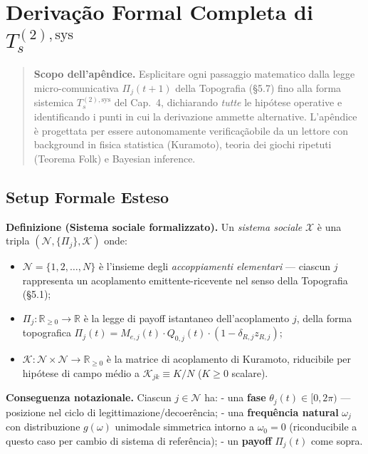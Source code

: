 \chapter{\texorpdfstring{Derivação Formal Completa di
\(T_s^{(2),\text{sys}}\)}{Derivação Formal Completa di T\_s\^{}\{(2),\textbackslash text\{sys\}\}}}\label{derivazione-formale-completa-di-t_s2textsys}

\begin{quote}
\textbf{Scopo dell'apêndice.} Esplicitare ogni passaggio matematico
dalla legge micro-comunicativa \(\Pi_j(t+1)\) della Topografia (\S{}5.7)
fino alla forma sistemica \(T_s^{(2),\text{sys}}\) del Cap.~4,
dichiarando \emph{tutte} le hipótese operative e identificando i punti in
cui la derivazione ammette alternative. L'apêndice è progettata per
essere autonomamente verificaçãobile da un lettore con background in fisica
statistica (Kuramoto), teoria dei giochi ripetuti (Teorema Folk) e
Bayesian inference.
\end{quote}



\section{Setup Formale Esteso}\label{setup-formale-esteso}

\Hypoth{} \textbf{Definizione (Sistema sociale formalizzato).} Un
\emph{sistema sociale} \(\mathcal{X}\) è una tripla
\((\mathcal{N}, \{\Pi_j\}, \mathcal{K})\) onde:

\begin{itemize}
\tightlist
\item
  \(\mathcal{N} = \{1, 2, \ldots, N\}\) è l'insieme degli
  \emph{accoppiamenti elementari} --- ciascun \(j\) rappresenta un
  acoplamento emittente-ricevente nel senso della Topografia (\S{}5.1);
\item
  \(\Pi_j : \mathbb{R}_{\geq 0} \to \mathbb{R}\) è la legge di payoff
  istantaneo dell'acoplamento \(j\), della forma topografica
  \(\Pi_j(t) = M_{e,j}(t) \cdot Q_{0,j}(t) \cdot (1 - \delta_{R,j} z_{R,j})\);
\item
  \(\mathcal{K} : \mathcal{N} \times \mathcal{N} \to \mathbb{R}_{\geq 0}\)
  è la matrice di acoplamento di Kuramoto, riducibile per hipótese di
  campo médio a \(\mathcal{K}_{jk} \equiv K/N\) (\(K \geq 0\) scalare).
\end{itemize}

\Proved{} \textbf{Conseguenza notazionale.} Ciascun
\(j \in \mathcal{N}\) ha: - una \textbf{fase}
\(\theta_j(t) \in [0, 2\pi)\) --- posizione nel ciclo di
legittimazione/decoerência; - una \textbf{frequência natural}
\(\omega_j\) con distribuzione \(g(\omega)\) unimodale simmetrica
intorno a \(\omega_0 = 0\) (riconducibile a questo caso per cambio di
sistema di referência); - un \textbf{payoff} \(\Pi_j(t)\) come sopra.



